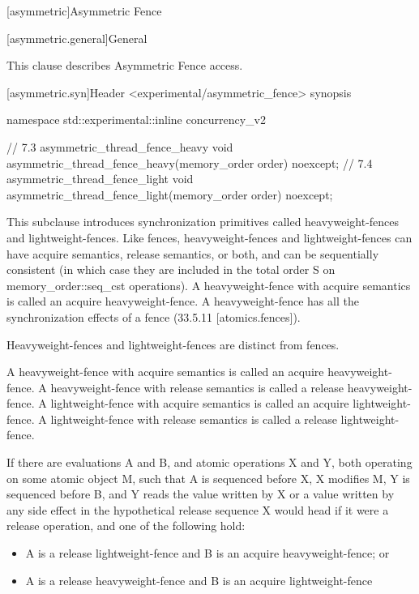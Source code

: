 
[asymmetric]{Asymmetric Fence}

[asymmetric.general]{General}

This clause describes Asymmetric Fence access. 


[asymmetric.syn]{Header <experimental/asymmetric_fence> synopsis}


\begin{codeblock}
namespace std::experimental::inline concurrency_v2 {


// 7.3 asymmetric_thread_fence_heavy
void asymmetric_thread_fence_heavy(memory_order order) noexcept;
// 7.4 asymmetric_thread_fence_light
void asymmetric_thread_fence_light(memory_order order) noexcept;


}
\end{codeblock}

\pnum

This subclause introduces synchronization primitives called heavyweight-fences and
lightweight-fences. Like fences, heavyweight-fences and lightweight-fences can have acquire
semantics, release semantics, or both, and can be sequentially consistent (in which case they
are included in the total order S on memory\_order::seq\_cst operations). A heavyweight-fence
with acquire semantics is called an acquire heavyweight-fence. A heavyweight-fence has all the
synchronization effects of a fence (33.5.11 [atomics.fences]). \begin{note}  Heavyweight-fences and
lightweight-fences are distinct from fences. \end{note}

\pnum
A heavyweight-fence with acquire semantics is called an acquire heavyweight-fence. A
heavyweight-fence with release semantics is called a release heavyweight-fence. A
lightweight-fence with acquire semantics is called an acquire lightweight-fence. A
lightweight-fence with release semantics is called a release lightweight-fence.

\pnum
If there are evaluations A and B, and atomic operations X and Y, both operating on some atomic
object M, such that A is sequenced before X, X modifies M, Y is sequenced before B, and Y
reads the value written by X or a value written by any side effect in the hypothetical release
sequence X would head if it were a release operation, and one of the following hold:
\begin{itemize}
    \item  A is a release lightweight-fence and B is an acquire heavyweight-fence; or
\item  A is a release heavyweight-fence and B is an acquire lightweight-fence
\end{itemize}

